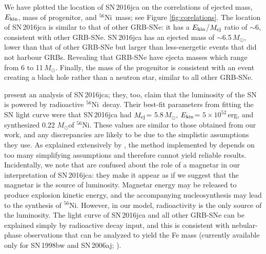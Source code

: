\documentclass[fleqn,usenatbib]{mnras}
\newcommand{\Msun}{$M_{\odot}$}
\newcommand{\Nifs}{$^{56}$Ni}
\newcommand{\Mej}{$M_{\rm ej}$}
\newcommand{\KE}{$E_{\rm kin}$}
\newcommand{\ab}{$\sim$}
\begin{document}
We have plotted the location of SN\,2016jca on the correlations of ejected mass, \KE, mass of progenitor, and \Nifs\ mass; see Figure \ref{fig:corelations}. The location of SN\,2016jca is similar to that of other GRB-SNe: it has a \KE/$M_{\rm {ej}}$ ratio of \ab6, consistent with  other GRB-SNe. SN\,2016jca has an ejected mass of \ab6.5\,\Msun, lower than that of other GRB-SNe but larger than less-energetic events that did not harbour GRBs.
Revealing that GRB-SNe have ejecta masses which range from 6 to 11\,\Msun. Finally, the mass of the progenitor is consistent with an event creating a black hole rather than a neutron star, similar to all other GRB-SNe. 


\citet{Cano17} present an analysis of SN\,2016jca; they, too, claim that the luminosity of the SN is powered by radioactive \Nifs\ decay.  Their best-fit parameters from fitting the SN light curve were that SN\,2016jca had \Mej = 5.8\,\Msun, \KE = $5 \times 10^{52}$\,erg, and synthesized 0.22 \Msun of \Nifs.   These values are similar to those obtained from our work, and any discrepancies are likely to be due to the simplistic assumptions they use.  As explained extensively by \citet{Mazzali17}, the method implemented by \citet{Cano17} depends on too many simplifying assumptions and therefore cannot yield reliable results. Incidentally, we note that \citet{Cano17} are confused about the role of a magnetar in our interpretation of SN\,2016jca: they make it appear as if we suggest that the magnetar is the source of luminosity. Magnetar energy may be released to produce explosion kinetic energy, and the accompanying nucleosynthesis may lead to the synthesis of $^{56}$Ni.  However, in our model, radioactivity is the only source of the luminosity. The light curve of SN\,2016jca and all other GRB-SNe can be explained simply by radioactive decay input, and this is consistent with nebular-phase observations that can be analyzed to yield the Fe mass (currently available only for SN\,1998bw and SN\,2006aj; \citealt{Mazzali01,Maeda07,Mazzali07}).
\end{document}
